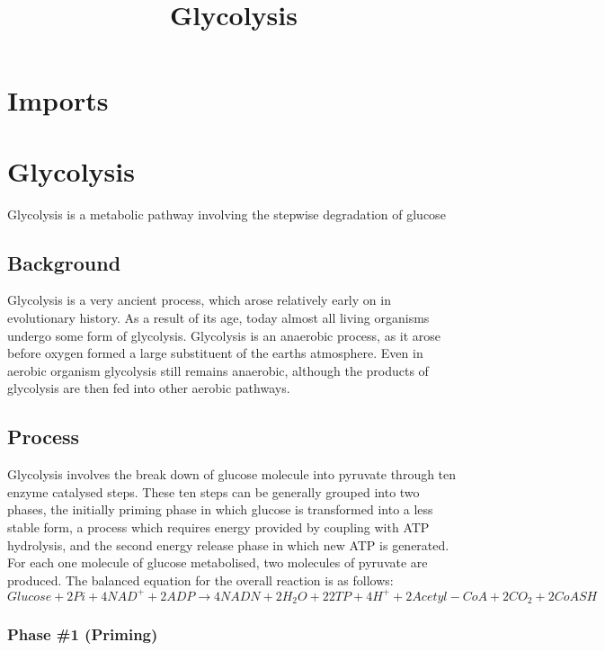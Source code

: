 \documentclass[]{article}
\title{Glycolysis}
\author{}
\date{}
\begin{document}
\maketitle

\hypertarget{imports}{%
\section{Imports}\label{imports}}

\hypertarget{glycolysis}{%
\section{Glycolysis}\label{glycolysis}}

Glycolysis is a metabolic pathway involving the stepwise degradation of
glucose

\hypertarget{background}{%
\subsection{Background}\label{background}}

Glycolysis is a very ancient process, which arose relatively early on in
evolutionary history. As a result of its age, today almost all living
organisms undergo some form of glycolysis. Glycolysis is an anaerobic
process, as it arose before oxygen formed a large substituent of the
earths atmosphere. Even in aerobic organism glycolysis still remains
anaerobic, although the products of glycolysis are then fed into other
aerobic pathways.

\hypertarget{process}{%
\subsection{Process}\label{process}}

Glycolysis involves the break down of glucose molecule into pyruvate
through ten enzyme catalysed steps. These ten steps can be generally
grouped into two phases, the initially priming phase in which glucose is
transformed into a less stable form, a process which requires energy
provided by coupling with ATP hydrolysis, and the second energy release
phase in which new ATP is generated. For each one molecule of glucose
metabolised, two molecules of pyruvate are produced. The balanced
equation for the overall reaction is as follows: \newline 
\(Glucose +2Pi+4NAD^++2ADP \rightarrow 4NADN+2H_2O+22TP+4H^++2Acetyl-CoA+2CO_2+2CoASH\)

\hypertarget{phase-1-priming}{%
\subsubsection{Phase \#1 (Priming)}\label{phase-1-priming}}
\end{document}
